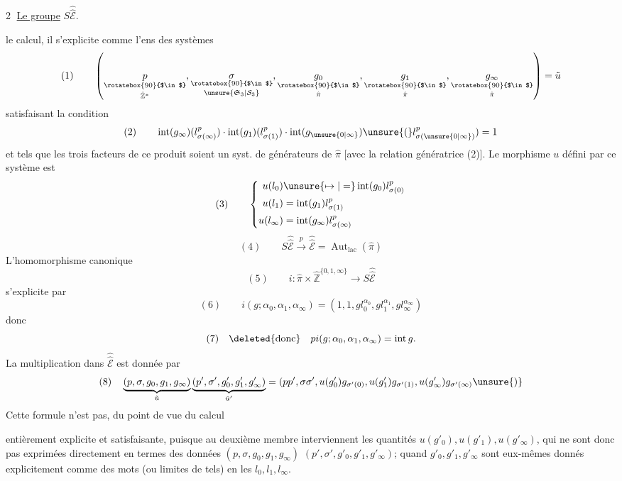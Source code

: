 \textcircled{2} \uline{Le groupe} $S\widehat{\widehat{\mathcal E}}$.

 le calcul, il s'explicite comme l'ens des systèmes
\[
(1)\qquad\left(\underset{\hat{\mathbb Z}^{*}}{\underset{\rotatebox{90}{$\in$}}{p}},\underset{\unsure{\mathfrak S_3|\mathcal S_3}}{\underset{\rotatebox{90}{$\in$}}{\sigma}},\underset{\hat\pi}{\underset{\rotatebox{90}{$\in$}}{g_0}},\underset{\hat\pi}{\underset{\rotatebox{90}{$\in$}}{g_1}},\underset{\hat\pi}{\underset{\rotatebox{90}{$\in$}}{g_\infty}}\right)=\tilde u
\]
satisfaisant la condition
\[
(2)\qquad\operatorname{int}(g_\infty)(l_{\sigma(\infty)}^p)\cdot\operatorname{int}(g_1)(l_{\sigma(1)}^p)\cdot\operatorname{int}(g_{\unsure{0|\infty}})\unsure{(}l_{\sigma(\unsure{0|\infty})}^p)=1
\]
et tels que les trois facteurs de ce produit soient un syst. de générateurs de $\hat\pi$ [avec la relation génératrice (2)]. Le morphisme $u$ défini par ce  système est
\[
(3)\qquad\left\{\begin{aligned}
u(l_0)&\unsure{\mapsto|=}\operatorname{int}(g_0)l_{\sigma(0)}^p\\
u(l_1)&=\operatorname{int}(g_1)l_{\sigma(1)}^p\\
u(l_\infty)&=\operatorname{int}(g_\infty)l_{\sigma(\infty)}^p
\end{aligned}\right.
\]
\[
(4)\qquad S\widehat{\widehat{\mathcal E}}\xrightarrow{p}\widehat{\widehat{\mathcal E}}=\operatorname{Aut}_{\mathrm{lac}}(\hat\pi)
\]
L'homomorphisme canonique
\[
(5)\qquad i:\hat\pi\times\hat{\mathbb Z}^{\{0,1,\infty\}}\longrightarrow S\widehat{\widehat{\mathcal E}}
\]
s'explicite par
\[
(6)\qquad i(g;\alpha_0,\alpha_1,\alpha_\infty)=(1,1,gl_0^{\alpha_0},gl_1^{\alpha_1},gl_\infty^{\alpha_\infty})
\]
donc
\[
(7)\quad\deleted{\text{donc}}\quad pi(g;\alpha_0,\alpha_1,\alpha_\infty)=\operatorname{int}g.
\]
La multiplication dans $\widehat{\widehat{\mathcal E}}$ est donnée par
\[
(8)\quad\underbrace{(p,\sigma,g_0,g_1,g_\infty)}_{\tilde u}\underbrace{(p',\sigma',g'_0,g'_1,g'_\infty)}_{\tilde u'}=(pp',\sigma\sigma',u(g'_0)g_{\sigma'(0)},u(g'_1)g_{\sigma'(1)},u(g'_\infty)g_{\sigma'(\infty)}\unsure{)}
\]
Cette formule n'est pas, du point de vue du calcul

entièrement explicite et satisfaisante, puisque au deuxième membre interviennent les quantités $u(g'_0),u(g'_1),u(g'_\infty)$, qui ne sont donc pas exprimées directement en termes des  données $(p,\sigma,g_0,g_1,g_\infty)$ $(p',\sigma',g'_0,g'_1,g'_\infty)$;  quand $g'_0,g'_1,g'_\infty$ sont eux-mêmes donnés explicitement comme des mots (ou limites de tels) en les $l_0,l_1,l_\infty$.

